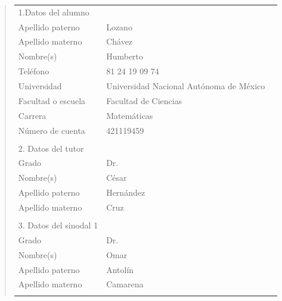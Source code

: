 {\small
\begin{quote}
\begin{tabular}{lll}
1.Datos del alumno          & {}                                          \\
Apellido paterno            & Lozano                                      \\
Apellido materno            & Ch\'avez                                    \\
Nombre(s)                   & Humberto                                    \\
Tel\'efono                  & 81 24 19 09 74                              \\
Universidad                 & Universidad Nacional Aut\'onoma de M\'exico \\
Facultad o escuela          & Facultad de Ciencias                        \\
Carrera                     & Matem\'aticas                               \\
N\'umero de cuenta          & 421119459                                   \\
{}                          & {}                                          \\
2. Datos del tutor          & {}                                          \\
Grado                       & Dr.                                         \\
Nombre(s)                   & C\'esar                                     \\
Apellido paterno            & Hern\'andez                                 \\
Apellido materno            & Cruz                                        \\
{}                          & {}                                          \\
3. Datos del sinodal 1      & {}                                          \\
Grado                       & Dr.                                         \\
Nombre(s)                   & Omar                                        \\
Apellido paterno            & Antol\'in                                   \\
Apellido materno            & Camarena                                    \\
{}                          & {}                                          \\

\end{tabular}
\end{quote}}
